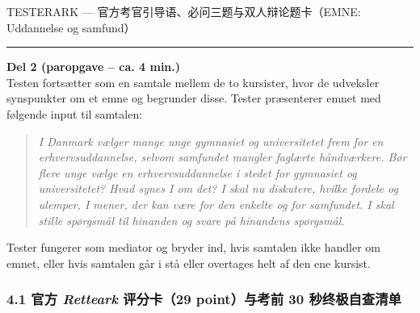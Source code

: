\begin{emailbox}{TESTERARK --- 官方考官引导语、必问三题与双人辩论题卡（EMNE: Uddannelse og samfund）}
\vspace{0.35em}
\hrule
\vspace{0.35em}
\textbf{\color{NCDRed}Del 2 (paropgave -- ca. 4 min.)}\\
Testen fortsætter som en samtale mellem de to kursister, hvor de udveksler synspunkter om et emne og begrunder disse. Tester præsenterer emnet med følgende input til samtalen:
\begin{quote}
\textit{I Danmark vælger mange unge gymnasiet og universitetet frem for en erhvervsuddannelse, selvom samfundet mangler faglærte håndværkere. Bør flere unge vælge en erhvervsuddannelse i stedet for gymnasiet og universitetet? Hvad synes I om det? I skal nu diskutere, hvilke fordele og ulemper, I mener, der kan være for den enkelte og for samfundet. I skal stille spørgsmål til hinanden og svare på hinandens spørgsmål.}
\end{quote}
\small\textcolor{NCDGray}{Tester fungerer som mediator og bryder ind, hvis samtalen ikke handler om emnet, eller hvis samtalen går i stå eller overtages helt af den ene kursist.}
\end{emailbox}

\clearpage
{}

\subsubsection*{4.1 官方 \textit{Retteark} 评分卡（29 point）与考前 30 秒终极自查清单}

